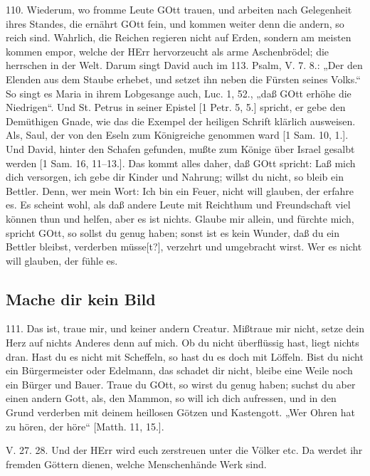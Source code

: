 110. Wiederum, wo fromme Leute GOtt trauen, und arbeiten nach Gelegenheit ihres Standes, die ernährt GOtt fein, und kommen weiter denn die andern, so reich sind. Wahrlich, die Reichen regieren nicht auf Erden, sondern am meisten kommen empor, welche der HErr hervorzeucht als arme Aschenbrödel; die herrschen in der Welt. Darum singt David auch im 113. Psalm, V. 7. 8.: „Der den Elenden aus dem Staube erhebet, und setzet ihn neben die Fürsten seines Volks.“ So singt es Maria in ihrem Lobgesange auch, Luc. 1, 52., „daß GOtt erhöhe die Niedrigen“. Und St. Petrus in seiner Epistel [1 Petr. 5, 5.] spricht, er gebe den Demüthigen Gnade, wie das die Exempel der heiligen Schrift klärlich ausweisen. Als, Saul, der von den Eseln zum Königreiche genommen ward [1 Sam. 10, 1.]. Und David, hinter den Schafen gefunden, mußte zum Könige über Israel gesalbt werden [1 Sam. 16, 11–13.]. Das kommt alles daher, daß GOtt spricht: Laß mich dich versorgen, ich gebe dir Kinder und Nahrung; willst du nicht, so bleib ein Bettler. Denn, wer mein Wort: Ich bin ein Feuer, nicht will glauben, der erfahre es. Es scheint wohl, als daß andere Leute mit Reichthum und Freundschaft viel können thun und helfen, aber es ist nichts. Glaube mir allein, und fürchte mich, spricht GOtt, so sollst du genug haben; sonst ist es kein Wunder, daß du ein Bettler bleibst, verderben müsse[t?], verzehrt und umgebracht wirst. Wer es nicht will glauben, der fühle es.

\subsection{Mache dir kein Bild}

111. Das ist, traue mir, und keiner andern Creatur. Mißtraue mir nicht, setze dein Herz auf nichts Anderes denn auf mich. Ob du nicht überflüssig hast, liegt nichts dran. Hast du es nicht mit Scheffeln, so hast du es doch mit Löffeln. Bist du nicht ein Bürgermeister oder Edelmann, das schadet dir nicht, bleibe eine Weile noch ein Bürger und Bauer. Traue du GOtt, so wirst du genug haben; suchst du aber einen andern Gott, als, den Mammon, so will ich dich aufressen, und in den Grund verderben mit deinem heillosen Götzen und Kastengott. „Wer Ohren hat zu hören, der höre“ [Matth. 11, 15.].

\begin{schriftzitat}
V. 27. 28. Und der HErr wird euch zerstreuen unter die Völker etc. Da werdet ihr fremden Göttern dienen, welche Menschenhände Werk sind.
\end{schriftzitat}

